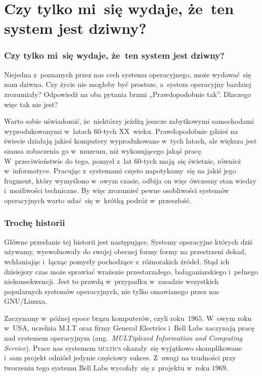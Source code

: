 \documentclass[10pt,t]{beamer}
\begin{document}
\section{Czy tylko mi~się wydaje, że~ten system jest dziwny?}


\begin{frame}
  \frametitle{Czy tylko mi~się wydaje, że~ten system jest dziwny?}


  Niejedna z~poznanych przez nas cech systemu operacyjnego, może
  wydawać~się nam dziwna. Czy życie nie mogłoby być prostsze, a~system
  operacyjny bardziej zrozumiały? Odpowiedź na oba pytania brzmi
  „Prawdopodobnie tak”. Dlaczego więc tak nie jest?

  Warto sobie uświadomić, że~niektórzy jeżdżą jeszcze zabytkowymi
  samochodami wyprodukowanymi w~latach $60$-tych XX~wieku. Prawdopodobnie
  gdzieś na świecie działają jakieś komputery wyprodukowane w~tych latach,
  ale większa jest szansa zobaczenia go w~muzeum, niż wykonującego jakąś
  pracę. W~przeciwieństwie do tego, pomysł z~lat $60$-tych mają~się
  świetnie, również w~informatyce. Pracując z~systemami często
  napotykamy~się na jakiś jego fragment, który wymyślono w~owym czasie,
  odbija on więc ówczesny stan wiedzy i~możliwości techniczne. By więc
  zrozumieć pewne osobliwości systemów operacyjnych warto udać~się w~krótką
  podróż w~przeszłość.

\end{frame}





\begin{frame}
  \frametitle{Trochę historii}


  Główne przesłanie tej historii jest następujące. Systemy operacyjne
  których dziś używamy, wyewoluowały do swojej obecnej formy formy
  na przestrzeni dekad, wchłaniając i~łącząc pomysły pochodzące
  z~różnorakich źródeł. Stąd ich dzisiejszy czas może sprawiać wrażenie
  przestarzałego, bałaganiarskiego i~pełnego niekonsekwencji. Jest to prawdą
  w~przypadku w~zasadzie wszystkich popularnych systemów operacyjnych, nie
  tylko omawianego przez nas GNU/Linuxa.

  Zaczynamy w~późnej epoce brązu komputerów, czyli roku~$1965$.
  W~owym roku w~USA, uczelnia M.I.T oraz firmy General Electrics i~Bell
  Labs zaczynają pracę nad systemem operacyjnym
  (ang.~\textit{MULTiplexed Information and Computing Service}). Prace
  nas systemem \textsc{multics} okazały~się wyjątkowo skomplikowane i~sam
  projekt odniósł jedynie częściowy sukces. Z~uwagi na trudności
  przy tworzeniu tego systemu Bell Labs wycofały~się z~projektu
  w~roku $1969$.

\end{frame}
\end{document}
